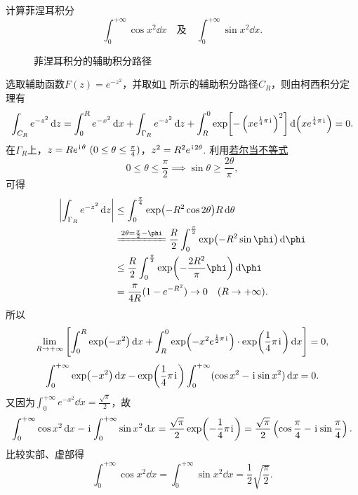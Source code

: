 \begin{example}
计算菲涅耳积分\[
\int_0^{+\infty} \cos x^2 \dd{x}
\quad\text{及}\quad
\int_0^{+\infty} \sin x^2 \dd{x}.
\]
\begin{solution}
\begin{figure}[ht]
\centering
{}
\caption{菲涅耳积分的辅助积分路径}
\label{figure:留数定理.菲涅耳积分的辅助积分路径}
\end{figure}

选取辅助函数\(F(z) = e^{-z^2}\)，并取如\cref{figure:留数定理.菲涅耳积分的辅助积分路径} 所示的辅助积分路径\(C_R\)，则由柯西积分定理有\[
\int_{C_R} e^{-z^2} \dd{z}
= \int_0^R e^{-x^2} \dd{x}
+ \int_{\Gamma_R} e^{-z^2} \dd{z}
+ \int_R^0 \exp[-\left(x e^{\frac{1}{4}\pi\kern1pt\mathrm{i}\kern1pt}\right)^2] \dd(x e^{\frac{1}{4}\pi\kern1pt\mathrm{i}\kern1pt})
= 0.
\]
在\(\Gamma_R\)上，\(z = R e^{\iu\theta}\ (0\leq\theta\leq\frac{\pi}{4})\)，\(z^2 = R^2 e^{\kern1pt\mathrm{i}\kern1pt2\theta}\).
利用\hyperref[equation:微分中值定理.若尔当不等式]{若尔当不等式}\[
0\leq\theta\leq\frac{\pi}{2}
\implies
\sin\theta\geq\frac{2\theta}{\pi},
\]可得\begin{align*}
\abs{\int_{\Gamma_R} e^{-z^2} \dd{z}}
&\leq
\int_0^{\frac{\pi}{4}} \exp(-R^2 \cos2\theta) R\dd{\theta} \\
&\xlongequal{2\theta=\frac{\pi}{2}-\phi}
\frac{R}{2} \int_0^{\frac{\pi}{2}} \exp(-R^2 \sin\phi) \dd{\phi} \\
&\leq
\frac{R}{2} \int_0^{\frac{\pi}{2}} \exp(-\frac{2R^2}{\pi}\phi) \dd{\phi} \\
&= \frac{\pi}{4R} (1-e^{-R^2})
\to0\quad(R\to+\infty).
\end{align*}
所以\[
\lim\limits_{R\to+\infty} \left[
\int_0^R \exp(-x^2) \dd{x}
+ \int_R^0 \exp(-x^2 e^{\frac{1}{2}\pi\kern1pt\mathrm{i}\kern1pt}) \cdot \exp(\frac{1}{4}\pi\kern1pt\mathrm{i}\kern1pt) \dd{x}
\right] = 0,
\]\[
\int_0^{+\infty} \exp(-x^2) \dd{x} - \exp(\frac{1}{4}\pi\kern1pt\mathrm{i}\kern1pt) \int_0^{+\infty} (\cos x^2 - \kern1pt\mathrm{i}\kern1pt \sin x^2) \dd{x} = 0.
\]又因为\(\int_0^{+\infty} e^{-x^2} \dd{x} = \frac{\sqrt{\pi}}{2}\)，故\[
\int_0^{+\infty} \cos x^2 \dd{x}
- \kern1pt\mathrm{i}\kern1pt \int_0^{+\infty} \sin x^2 \dd{x}
= \frac{\sqrt{\pi}}{2} \exp(-\frac{1}{4}\pi\kern1pt\mathrm{i}\kern1pt)
= \frac{\sqrt{\pi}}{2} \left(\cos\frac{\pi}{4} - \kern1pt\mathrm{i}\kern1pt \sin\frac{\pi}{4}\right).
\]比较实部、虚部得\begin{equation}\label{equation:留数定理.菲涅耳积分}
\int_0^{+\infty} \cos x^2 \dd{x}
= \int_0^{+\infty} \sin x^2 \dd{x}
= \frac{1}{2} \sqrt{\frac{\pi}{2}}.
\end{equation}
\end{solution}
\end{example}

